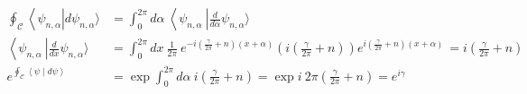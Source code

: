 \documentclass[../../FisicaTeorica.tex]{subfiles}
\begin{document}
\begin{align*}
\oint_{\mathcal{C}}{\left\langle\psi_{n,\alpha}\right|d\psi_{n,\alpha}\rangle}&=\int_{0}^{2\pi}{d\alpha\ \left\langle\psi_{n,\alpha}\ \right|\frac{d}{d\alpha}\psi_{n,\alpha}\rangle\ }\\
\left\langle\psi_{n,\alpha}\ \right|\frac{d}{dx}\psi_{n,\alpha} \rangle &=\int_{0}^{2\pi}{dx\ \frac{1}{2\pi}\ e^{-i\left(\frac{\gamma}{2\pi}+n\right)\left(x+\alpha\right)}\left(i\left(\frac{\gamma}{2\pi}+n\right)\right)e^{i\left(\frac{\gamma}{2\pi}+n\right)\left(x+\alpha\right)\ }}=i\left(\frac{\gamma}{2\pi}+n\right)\\
e^{\oint_{\mathcal{C}}\left\langle\psi\middle| d\psi\right\rangle}&=\exp{\int_{0}^{2\pi}{d\alpha\ i\left(\frac{\gamma}{2\pi}+n\right)}}=\exp{i\ 2\pi\left(\frac{\gamma}{2\pi}+n\right)}=e^{i\gamma} 
\end{align*}
\end{document}
